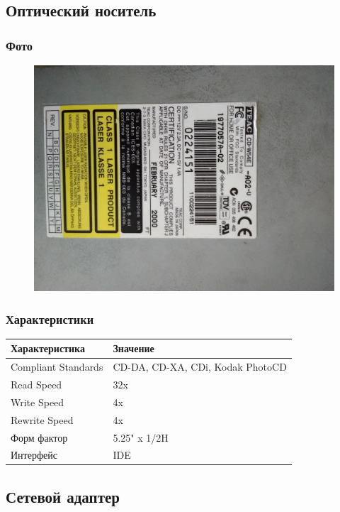\documentclass[a4paper]{article}
\begin{document}
\subsection{Оптический носитель}
\subsubsection{Фото}
\begin{figure}[H]
\centering
\includegraphics[scale=0.1]{cd.jpg} 
\end{figure}
\subsubsection{Характеристики}
\begin{table}[H]
    \centering
    \begin{tabular}{|l|l|}
    \hline
    Характеристика & Значение \\
    \hline
    Compliant Standards & CD-DA, CD-XA, CDi, Kodak PhotoCD \\
    Read Speed & 32x \\
    Write Speed & 4x \\
    Rewrite Speed & 4x \\
    Форм фактор & 5.25" x 1/2H \\
    Интерфейс & IDE \\
    \hline
\end{tabular}
\end{table}

\subsection{Сетевой адаптер}
\end{document}
